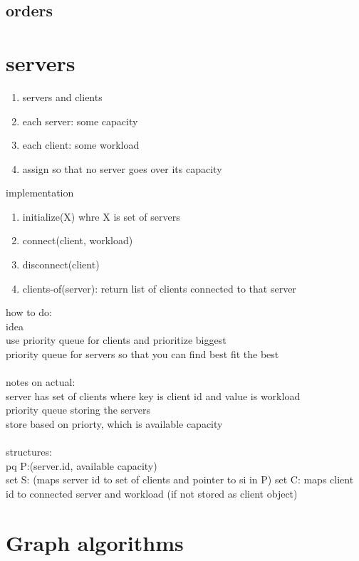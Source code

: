 \documentclass{article}
\begin{document}
\subsection{orders}


\section{servers}
\begin{enumerate}
    \item servers and clients
    \item each server: some capacity
    \item each client: some workload
    \item assign so that no server goes over its capacity
\end{enumerate}
implementation
\begin{enumerate}
    \item initialize(X) whre X is set of servers
    \item connect(client, workload)
    \item disconnect(client)
    \item clients-of(server): return list of clients connected to that server
\end{enumerate}
how to do:\\
idea\\
use priority queue for clients and prioritize biggest \\
priority queue for servers so that you can find best fit the best\\
\\
notes on actual:\\
server has set of clients where key is client id and value is workload\\
priority queue storing the servers\\
store based on priorty, which is available capacity\\
\\
structures:\\
pq P:(server.id, available capacity)\\
set S: (maps server id to set of clients and pointer to si in P)
set C: maps client id to connected server and workload (if not stored as client object)

\section{Graph algorithms}
\end{document}
